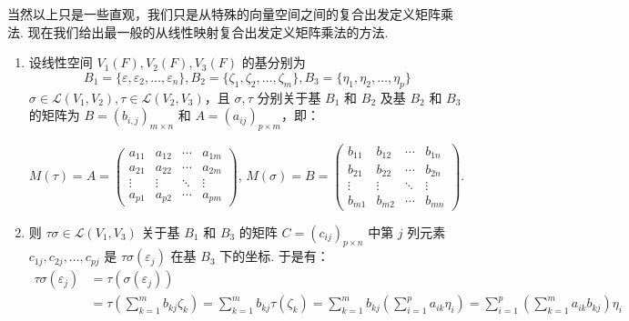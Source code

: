 
当然以上只是一些直观，我们只是从特殊的向量空间之间的复合出发定义矩阵乘法. 现在我们给出最一般的从线性映射复合出发定义矩阵乘法的方法.

\begin{enumerate}
    \item 设线性空间 $V_1(F), V_2(F), V_3(F)$ 的基分别为
    \[B_1 = \{\varepsilon, \varepsilon_2,\ldots,\varepsilon_n\}, B_2 = \{\zeta_1,\zeta_2,\ldots,\zeta_m\}, B_3 = \{\eta_1,\eta_2,\ldots,\eta_p\}\]
    $\sigma \in \mathcal{L}(V_1,V_2), \tau \in \mathcal{L}(V_2,V_3)$，且 $\sigma, \tau$ 分别关于基 $B_1$ 和 $B_2$ 及基 $B_2$ 和 $B_3$ 的矩阵为 $B=(b_{i,j})_{m \times n}$ 和 $A=(a_{ij})_{p\times m}$，即：

          $M(\tau)=A=\begin{pmatrix}
                  a_{11} & a_{12} & \cdots & a_{1m} \\
                  a_{21} & a_{22} & \cdots & a_{2m} \\
                  \vdots & \vdots & \ddots & \vdots \\
                  a_{p1} & a_{p2} & \cdots & a_{pm}
              \end{pmatrix}$,
          $M(\sigma)=B=\begin{pmatrix}
                  b_{11} & b_{12} & \cdots & b_{1n} \\
                  b_{21} & b_{22} & \cdots & b_{2n} \\
                  \vdots & \vdots & \ddots & \vdots \\
                  b_{m1} & b_{m2} & \cdots & b_{mn}
              \end{pmatrix}$.

    \item 则 $\tau\sigma \in \mathcal{L}(V_1,V_3)$ 关于基 $B_1$ 和 $B_3$ 的矩阵 $C=(c_{ij})_{p\times n}$ 中第 $j$ 列元素 $c_{1j},c_{2j},\ldots,c_{pj}$ 是 $\tau\sigma(\varepsilon_j)$ 在基 $B_3$ 下的坐标. 于是有：
          \begin{align*}
            \tau\sigma(\varepsilon_j) &= \tau(\sigma(\varepsilon_j)) \\
            &= \tau\left(\sum_{k=1}^{m}b_{kj}\zeta_k\right) = \sum_{k=1}^{m}b_{kj}\tau(\zeta_k) = \sum_{k=1}^{m}b_{kj}\left(\sum_{i=1}^{p}a_{ik}\eta_i\right) = \sum_{i=1}^{p}\left(\sum_{k=1}^{m}a_{ik}b_{kj}\right)\eta_i
          \end{align*}


\end{enumerate}
